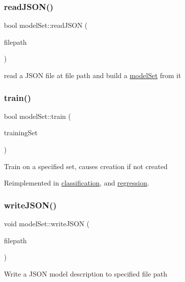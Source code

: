 \subsubsection{\texorpdfstring{read\+J\+S\+O\+N()}{readJSON()}}
{\footnotesize\ttfamily bool model\+Set\+::read\+J\+S\+ON (\begin{DoxyParamCaption}\item[{std\+::string}]{filepath }\end{DoxyParamCaption})}

read a J\+S\+ON file at file path and build a \hyperlink{classmodel_set}{model\+Set} from it \mbox{\label{classmodel_set_ab0b16ec988c8077158de1c3d8986df03}} 
\subsubsection{\texorpdfstring{train()}{train()}}
{\footnotesize\ttfamily bool model\+Set\+::train (\begin{DoxyParamCaption}\item[{std\+::vector$<$ \hyperlink{structtraining_example}{training\+Example} $>$}]{training\+Set }\end{DoxyParamCaption})\hspace{0.3cm}{\ttfamily [virtual]}}

Train on a specified set, causes creation if not created 

Reimplemented in \hyperlink{classclassification_a8e834c25309bc471c5bb8e8730874c82}{classification}, and \hyperlink{classregression_ae45d7dbf24cab75202d966d116829813}{regression}.

\mbox{\label{classmodel_set_a805879b6c8ec54d16c2ac511c72442b9}} 
\subsubsection{\texorpdfstring{write\+J\+S\+O\+N()}{writeJSON()}}
{\footnotesize\ttfamily void model\+Set\+::write\+J\+S\+ON (\begin{DoxyParamCaption}\item[{std\+::string}]{filepath }\end{DoxyParamCaption})}

Write a J\+S\+ON model description to specified file path 

